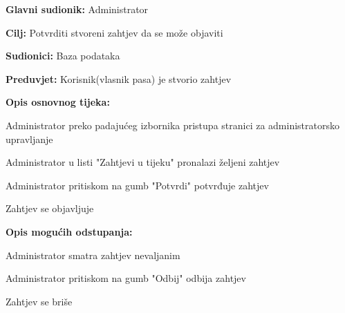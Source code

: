 					\noindent {}
					\begin{packed_item}
						
						\item \textbf{Glavni sudionik: } Administrator
						\item  \textbf{Cilj:} Potvrditi stvoreni zahtjev da se može objaviti
						\item  \textbf{Sudionici:} Baza podataka
						\item  \textbf{Preduvjet:} Korisnik(vlasnik pasa) je stvorio zahtjev
						\item  \textbf{Opis osnovnog tijeka:}
						
						\item[] \begin{packed_enum}
							
							\item Administrator preko padajućeg izbornika pristupa stranici za administratorsko upravljanje
							\item Administrator u listi "Zahtjevi u tijeku" pronalazi željeni zahtjev
							\item Administrator pritiskom na gumb "Potvrdi" potvrđuje zahtjev
							\item Zahtjev se objavljuje
							
						\end{packed_enum}
						\item  \textbf{Opis mogućih odstupanja:}
						
						\item[] \begin{packed_item}
							
							\item[3.a] Administrator smatra zahtjev nevaljanim
							\item[] \begin{packed_enum}
								
								\item Administrator pritiskom na gumb "Odbij" odbija zahtjev
								\item Zahtjev se briše 
								
							\end{packed_enum}
							
						\end{packed_item}
					\end{packed_item}
					
